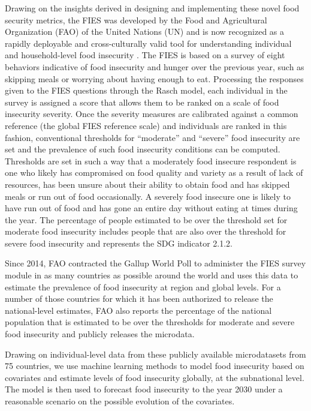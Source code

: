 \documentclass{article}
\begin{document}
Drawing on the insights derived in designing and implementing these novel food security metrics, the FIES was developed by the Food and Agricultural Organization (FAO) of the United Nations (UN) \cite{Ballard2013} and is now recognized as a rapidly deployable and cross-culturally valid tool for understanding individual and household-level food insecurity \citep{wambogo2018validity, smith2017world}.  The FIES is based on a survey of eight behaviors indicative of food insecurity and hunger over the previous year, such as skipping meals or worrying about having enough to eat.  Processing the responses given to the FIES questions through the Rasch model, each individual in the survey is assigned a score that allows them to be ranked on a scale of food insecurity severity. Once the severity measures are calibrated against a common reference (the global FIES reference scale) \citep{Cafiero2018} and individuals are ranked in this fashion, conventional thresholds for ``moderate'' and ``severe'' food insecurity are set and the prevalence of such food insecurity conditions can be computed. Thresholds are set in such a way that a moderately food insecure respondent is one who likely has compromised on food quality and variety as a result of lack of resources, has been unsure about their ability to obtain food and has skipped meals or run out of food occasionally. A severely food insecure one is likely to have run out of food and has gone an entire day without eating at times during the year.  The percentage of people estimated to be over the threshold set for moderate food insecurity includes people that are also over the threshold for severe food insecurity and represents the SDG indicator 2.1.2.

Since 2014, FAO contracted the Gallup World Poll to administer the FIES survey module in as many countries as possible around the world and uses this data to estimate the prevalence of food insecurity at region and global levels. For a number of those countries for which it has been authorized to release the national-level estimates, FAO also reports the percentage of the national population that is estimated to be over the thresholds for moderate and severe food insecurity and publicly releases the microdata.

Drawing on individual-level data from these publicly available microdatasets from 75 countries, we use machine learning methods to model food insecurity based on covariates and estimate levels of food insecurity globally, at the subnational level.  The model is then used to forecast food insecurity to the year 2030 under a reasonable scenario on the possible evolution of the covariates.
\end{document}
